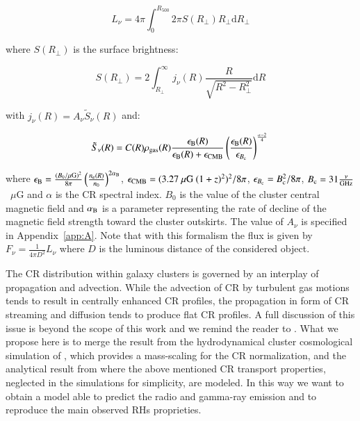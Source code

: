 \documentclass[traditabstract]{aa}
\newcommand{\rmn}{\mathrm}
\begin{document}
\begin{equation}
L_{\nu} = 4\pi \int_{0}^{R_{500}} 2\pi S(R_{\perp}) R_{\perp} \rmn{d}R_{\perp}
\label{eq:luminosity}
\end{equation}

where $S(R_{\perp})$ is the surface brightness:

\begin{equation}
S(R_{\perp}) = 2 \int_{R_{\perp}}^{\infty} j_{\nu}(R) \frac{R}{\sqrt{R^{2}-R_{\perp}^{2}}} \rmn{d}R
\label{eq:surface_brightness_1}
\end{equation}

with $ j_{\nu}(R)=A_{\nu}\tilde{S}_{\nu}(R)$ and:

\begin{equation}
\tilde{S}_{\nu}(R)  =  C(R) \rho_{\rm{gas}}(R) \frac{\epsilon_{\rm{B}}(R)}{\epsilon_{\rm{B}}(R)+\epsilon_{\rm{CMB}}} \left( \frac{\epsilon_{\rm{B}}(R)}{\epsilon_{B_{\rm{c}}}} \right)^{\frac{\alpha-2}{4}} \\
\label{eq:surface_brightness_2}
\end{equation}

where $\epsilon_{\rm{B}}=\frac{(B_{0}/\mu\rmn{G})^{2}}{8\pi}\left(\frac{n_{\rm{e}}(R)}{n_{0}}\right)^{2\alpha_{\rm{B}}}$, $\epsilon_{\rm{CMB}}=(3.27~\mu\rmn{G}~(1+z)^{2})^{2}/8\pi$, $\epsilon_{B_{\rm{c}}}=B_{\rm{c}}^{2}/8\pi$, $B_{\rm{c}}=31\frac{\nu}{\rmn{GHz}}$~$\mu$G and $\alpha$ is the CR spectral index. $B_{0}$ is the value of the cluster central magnetic field and $\alpha_{\rm{B}}$ is a parameter representing the rate of decline of the magnetic field strength toward the cluster outskirts. The value of $A_{\nu}$ is specified in Appendix~\ref{app:A}. 
Note that with this formalism the flux is given by $F_{\nu}=\frac{1}{4\pi D^{2}}L_{\nu}$ where $D$ is the luminous distance of the considered object.

The CR distribution within galaxy clusters is governed by an interplay of propagation and advection. While the advection of CR by turbulent gas motions tends to result in centrally enhanced CR profiles, the propagation in form of CR streaming and diffusion tends to produce flat CR profiles. A full discussion of this issue is beyond the scope of this work and we remind the reader to \cite{2011A&A...527A..99E}. What we propose here is to merge the result from the hydrodynamical cluster cosmological simulation of \cite{2010MNRAS.409..449P}, which provides a mass-scaling for the CR normalization, and the analytical result from \cite{2011A&A...527A..99E} where the above mentioned CR transport properties, neglected in the \cite{2010MNRAS.409..449P} simulations for simplicity, are modeled. In this way we want to obtain a model able to predict the radio and gamma-ray emission and to reproduce the main observed RHs proprieties.
\end{document}
